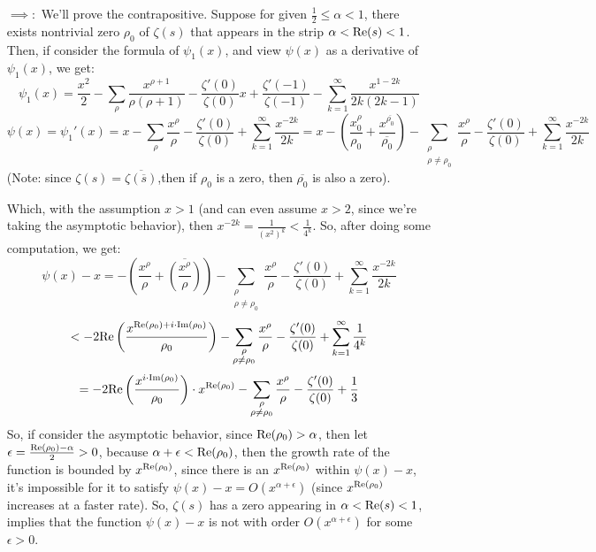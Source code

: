 \documentclass{article}
\begin{document}
\begin{itemize}
    \item[$\implies:$] We'll prove the contrapositive. Suppose for given $\frac{1}{2}\leq \alpha<1$, there exists nontrivial zero $\rho_0$ of $\zeta(s)$ that appears in the strip $\alpha<\textmd{Re}(s)<1$. Then, if consider the formula of $\psi_1(x)$, and view $\psi(x)$ as a derivative of $\psi_1(x)$, we get:
    $$\psi_1(x)=\frac{x^2}{2}-\sum_{\rho}\frac{x^{\rho+1}}{\rho(\rho+1)}-\frac{\zeta'(0)}{\zeta(0)}x+\frac{\zeta'(-1)}{\zeta(-1)}-\sum_{k=1}^{\infty}\frac{x^{1-2k}}{2k(2k-1)}$$
    $$\psi(x)=\psi_1'(x)=x-\sum_{\rho}\frac{x^\rho}{\rho}-\frac{\zeta'(0)}{\zeta(0)}+\sum_{k=1}^{\infty}\frac{x^{-2k}}{2k} =x-\left(\frac{x^\rho_0}{\rho_0}+\frac{x^{\overline{\rho_0}}}{\overline{\rho_0}}\right)-\sum_{\substack{\rho\\\rho\neq \rho_0}}\frac{x^\rho}{\rho}-\frac{\zeta'(0)}{\zeta(0)}+\sum_{k=1}^{\infty}\frac{x^{-2k}}{2k}$$
    (Note: since $\zeta(s)=\overline{\zeta(\overline{s})}$,then if $\rho_0$ is a zero, then $\overline{\rho_0}$ is also a zero).

    Which, with the assumption $x>1$ (and can even assume $x>2$, since we're taking the asymptotic behavior), then $x^{-2k} = \frac{1}{(x^2)^k} < \frac{1}{4^k}$. So, after doing some computation, we get:
    $$\psi(x)-x = -\left(\frac{x^\rho}{\rho}+\overline{\left(\frac{x^\rho}{\rho}\right)}\right)-\sum_{\substack{\rho\\\rho\neq \rho_0}}\frac{x^\rho}{\rho}-\frac{\zeta'(0)}{\zeta(0)}+\sum_{k=1}^{\infty}\frac{x^{-2k}}{2k}$$
    $$ < -2\textmd{Re}\left(\frac{x^{\textmd{Re}(\rho_0)+i\cdot
    \textmd{Im}(\rho_0)}}{\rho_0}\right)-\sum_{\substack{\rho\\\rho\neq \rho_0}}\frac{x^\rho}{\rho}-\frac{\zeta'(0)}{\zeta(0)} + \sum_{k=1}^{\infty}\frac{1}{4^k}$$
    $$ = -2\textmd{Re}\left(\frac{x^{i\cdot \textmd{Im}(\rho_0)}}{\rho_0}\right)\cdot x^{\textmd{Re}(\rho_0)} -\sum_{\substack{\rho\\\rho\neq \rho_0}}\frac{x^\rho}{\rho}-\frac{\zeta'(0)}{\zeta(0)} + \frac{1}{3}$$
    So, if consider the asymptotic behavior, since $\textmd{Re}(\rho_0)>\alpha$, then let $\epsilon=\frac{\textmd{Re}(\rho_0)-\alpha}{2}>0$, because $\alpha + \epsilon < \textmd{Re}(\rho_0)$, then the growth rate of the function is bounded by $x^{\textmd{Re}(\rho_0)}$, since there is an $x^{\textmd{Re}(\rho_0)}$ within $\psi(x)-x$, it's impossible for it to satisfy $\psi(x)-x=O(x^{\alpha+\epsilon})$ (since $x^{\textmd{Re}(\rho_0)}$ increases at a faster rate).
    So, $\zeta(s)$ has a zero appearing in $\alpha<\textmd{Re}(s)<1$, implies that the function $\psi(x)-x$ is not with order $O(x^{\alpha+\epsilon})$ for some $\epsilon>0$.


\end{itemize}
\end{document}
